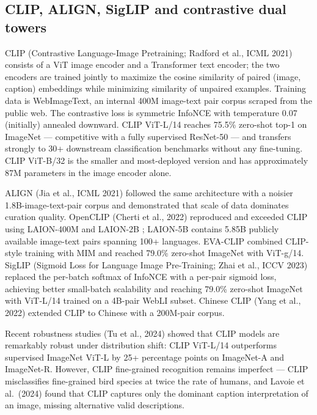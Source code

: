 \documentclass{article}
\begin{document}
\subsection{CLIP, ALIGN, SigLIP and contrastive dual towers}\label{clip-align-siglip-and-contrastive-dual-towers}

CLIP (Contrastive Language-Image Pretraining; Radford et al., ICML 2021) consists of a ViT image encoder and a Transformer text encoder; the two encoders are trained jointly to maximize the cosine similarity of paired (image, caption) embeddings while minimizing similarity of unpaired examples. Training data is WebImageText, an internal 400M image-text pair corpus scraped from the public web. The contrastive loss is symmetric InfoNCE with temperature 0.07 (initially) annealed downward. CLIP ViT-L/14 reaches 75.5\% zero-shot top-1 on ImageNet --- competitive with a fully supervised ResNet-50 --- and transfers strongly to 30+ downstream classification benchmarks without any fine-tuning. CLIP ViT-B/32 is the smaller and most-deployed version and has approximately 87M parameters in the image encoder alone.

ALIGN (Jia et al., ICML 2021) followed the same architecture with a noisier 1.8B-image-text-pair corpus and demonstrated that scale of data dominates curation quality. OpenCLIP (Cherti et al., 2022) reproduced and exceeded CLIP using LAION-400M and LAION-2B \citep{schuhmann2022laion5banopenlarge}; LAION-5B contains 5.85B publicly available image-text pairs spanning 100+ languages. EVA-CLIP combined CLIP-style training with MIM and reached 79.0\% zero-shot ImageNet with ViT-g/14. SigLIP (Sigmoid Loss for Language Image Pre-Training; Zhai et al., ICCV 2023) replaced the per-batch softmax of InfoNCE with a per-pair sigmoid loss, achieving better small-batch scalability and reaching 79.0\% zero-shot ImageNet with ViT-L/14 trained on a 4B-pair WebLI subset. Chinese CLIP (Yang et al., 2022) extended CLIP to Chinese with a 200M-pair corpus.

Recent robustness studies (Tu et al., 2024) showed that CLIP models are remarkably robust under distribution shift: CLIP ViT-L/14 outperforms supervised ImageNet ViT-L by 25+ percentage points on ImageNet-A and ImageNet-R. However, CLIP fine-grained recognition remains imperfect --- CLIP misclassifies fine-grained bird species at twice the rate of humans, and Lavoie et al.~(2024) found that CLIP captures only the dominant caption interpretation of an image, missing alternative valid descriptions.
\end{document}
